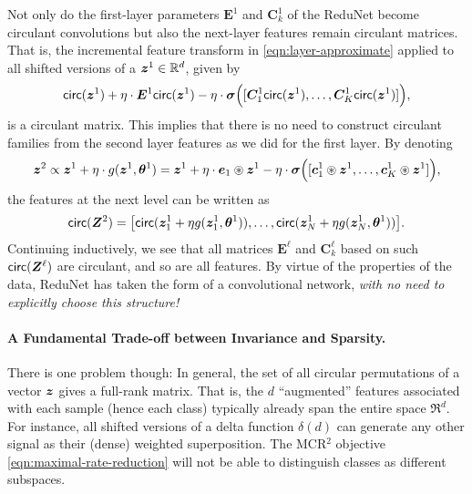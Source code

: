 \documentclass[\toplevelprefix/book-main.tex]{subfiles}
\begin{document}
Not only do the first-layer parameters $\bm E^1$ and $\bm{C}^1_k$ of the ReduNet become circulant convolutions but also the next-layer features remain circulant matrices. 
That is, the incremental feature transform in \eqref{eqn:layer-approximate} applied to all shifted versions of a $\bm{z}^1 \in \mathbb{R}^d$, given by
\begin{equation}
    \mathsf{circ}(\bm{z}^1) + \eta \cdot \bm E^1 \mathsf{circ}(\bm{z}^1) - \eta \cdot \bm \sigma \Big([\bm{C}_1^1 \mathsf{circ}(\bm{z}^1), \ldots, \bm{C}^1_K \mathsf{circ}(\bm{z}^1)] \Big),
\end{equation}
is a circulant matrix.  This implies that there is no need to construct circulant families from the second layer features as we did for the first layer. 
By denoting
\begin{equation}
\bm{z}^{2} \propto \bm{z}^{1} +\eta \cdot g(\bm{z}^{1}, \bm \theta^{1}) =  \bm{z}^1 + \eta \cdot \bm e_{1} \circledast \bm{z}^{1} -  \eta \cdot \bm \sigma\Big([\bm{c}_{1}^{1} \circledast \bm{z}^{1}, \dots, \bm{c}^{1}_{K} \circledast \bm{z}^{1}]\Big),
\label{eqn:approximate-convolution}
\end{equation}
the features at the next level can be written as
$$\mathsf{circ}(\bm Z^2) = \big[ \mathsf{circ}( \bm z_{1}^1 + \eta g( \bm z_{1}^1, \bm \theta^1)), \dots, \mathsf{circ}( \bm z_{N}^1 + \eta g(\bm z_{N}^1, \bm \theta^1)) \big].$$
Continuing inductively, we see that all matrices $\bm E^\ell$ and $\bm C^\ell_k$ based on such $\mathsf{circ}(\bm Z^\ell)$ are circulant, and so are all features. 
By virtue of the properties of the data, ReduNet has taken the form of a convolutional network, {\em with no need to explicitly choose this structure!} 

\paragraph{A Fundamental Trade-off between Invariance and Sparsity.} 
There is one problem though: In general, the set of all circular permutations of a vector $\bm{z}$ gives a full-rank matrix. That is, the $d$ ``augmented'' features associated with each sample (hence each class) typically already span the entire space $\Re^d$. For instance, all shifted versions of a delta function $\delta(d)$ can generate any other signal as their (dense) weighted superposition. The MCR$^2$ objective \eqref{eqn:maximal-rate-reduction} will not be able to distinguish classes as different subspaces.
\end{document}

